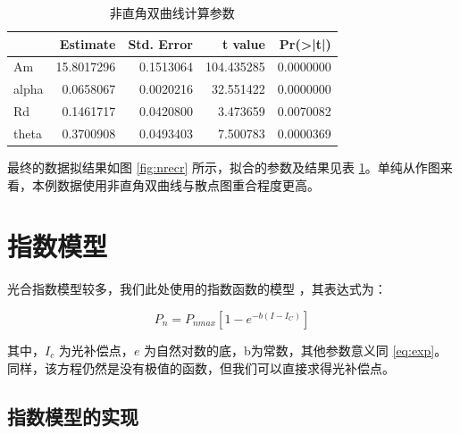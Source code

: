 \documentclass[
]{krantz}
\begin{document}
\begin{table}

\caption{\label{tab:nrectable}非直角双曲线计算参数}
\centering
\begin{tabular}[t]{lrrrr}
\toprule
  & Estimate & Std. Error & t value & Pr(>|t|)\\
\midrule
Am & 15.8017296 & 0.1513064 & 104.435285 & 0.0000000\\
alpha & 0.0658067 & 0.0020216 & 32.551422 & 0.0000000\\
Rd & 0.1461717 & 0.0420800 & 3.473659 & 0.0070082\\
theta & 0.3700908 & 0.0493403 & 7.500783 & 0.0000369\\
\bottomrule
\end{tabular}
\end{table}

最终的数据拟结果如图 \ref{fig:nrecr} 所示，拟合的参数及结果见表 \ref{tab:nrectable}。单纯从作图来看，本例数据使用非直角双曲线与散点图重合程度更高。

\cleardoublepage

\hypertarget{lrc_exp}{%
\section{指数模型}\label{lrc_exp}}

光合指数模型较多，我们此处使用的指数函数的模型 \citet{Prado1997Photosynthetic}，其表达式为：

\begin{equation}
P_{n} = P_{nmax}[1 - e^{-b(I-I_{C})}]
\label{eq:exp}
\end{equation}

其中，\(I_{c}\) 为光补偿点，\(e\) 为自然对数的底，b为常数，其他参数意义同 \eqref{eq:exp}。同样，该方程仍然是没有极值的函数，但我们可以直接求得光补偿点。

\hypertarget{lrc_exp_exam}{%
\subsection{指数模型的实现}\label{lrc_exp_exam}}
\end{document}
